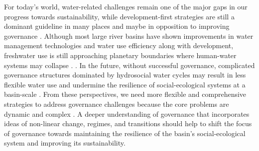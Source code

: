 For today's world, water-related challenges remain one of the major gaps in our progress towards sustainability, while development-first strategies are still a dominant guideline in many places and maybe in opposition to improving governance
\cite{xuAssessingprogresssustainable2020,liuAerosolweakenedsummermonsoons2017,greveGlobalassessmentwater2018}.
Although most large river basins have shown improvements in water management technologies and water use efficiency along with development, freshwater use is still approaching planetary boundaries where human-water systems may collapse
\cite{anExploringeffectsGrain2017,degraafEnvironmentalflowlimits2019,hugginssocialecologicaldimensionschanging2020}.
\cite{graftonparadoxirrigationefficiency2018}.
In the future, without successful governance, complicated governance structures dominated by hydrosocial water cycles may result in less flexible water use and undermine the resilience of social-ecological systems at a basin-scale
\cite{qinFlexibilityintensityglobal2019,leviaHomogenizationterrestrialwater2020,grillMappingworldfreeflowing2019}.
From these perspectives, we need more flexible and comprehensive strategies to address governance challenges because the core problems are dynamic and complex
\cite{steffenemergenceevolutionEarth2020,muneepeerakulemergenceresilienceselforganized2020,bodinCollaborativeenvironmentalgovernance2017,biermannNavigatingAnthropoceneImproving2012}.
A deeper understanding of governance that incorporates ideas of non-linear change, regimes, and transitions should help to shift the focus of governance towards maintaining the resilience of the basin’s social-ecological system and improving its sustainability.
